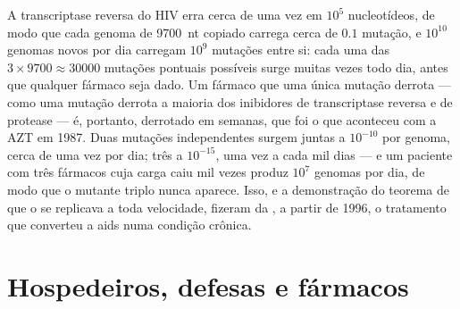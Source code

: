 \begin{example}\label{ex:b3:virology:three-drugs}
A transcriptase reversa do HIV erra cerca de uma vez em $10^{5}$
nucleotídeos, de modo que cada genoma de \qty{9700}{nt} copiado carrega
cerca de $0.1$ mutação, e $10^{10}$ genomas novos por dia carregam
$10^{9}$ mutações entre si: cada uma das
$3\times 9700 \approx \num{30000}$ mutações pontuais possíveis surge
muitas vezes todo dia, antes que qualquer fármaco seja dado. Um fármaco
que uma única mutação derrota --- como uma mutação derrota a maioria
dos inibidores de transcriptase reversa e de protease --- é, portanto,
derrotado em semanas, que foi o que aconteceu com a AZT em 1987. Duas
mutações independentes surgem juntas a $10^{-10}$ por genoma, cerca de
uma vez por dia; três a $10^{-15}$, uma vez a cada mil dias --- e um
paciente com três fármacos cuja carga caiu mil vezes produz $10^{7}$
genomas por dia, de modo que o mutante triplo nunca aparece. Isso, e a
demonstração do teorema de que o  se replicava a toda velocidade,
fizeram da , a partir de 1996, o tratamento que
converteu a aids numa condição crônica.
\end{example}

\section{Hospedeiros, defesas e fármacos}

